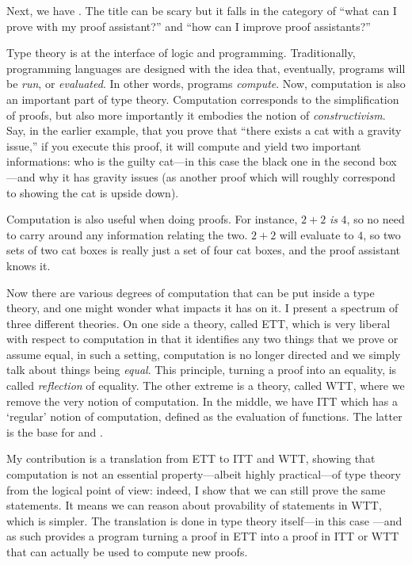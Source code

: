 Next, we have . The title can be scary but it falls in
the category of ``what can I prove with my proof assistant?'' and
``how can I improve proof assistants?''

Type theory is at the interface of logic and programming. Traditionally,
programming languages are designed with the idea that, eventually, programs
will be \emph{run}, or \emph{evaluated}. In other words, programs
\emph{compute}.
Now, computation is also an important part of type theory. Computation
corresponds to the simplification of proofs, but also more importantly it
embodies the notion of \emph{constructivism}. Say, in the earlier example,
that you prove that ``there exists a cat with a gravity issue,'' if you execute
this proof, it will compute and yield two important informations: who is the
guilty cat---in this case the black one in the second box---and why it has
gravity issues (as another proof which will roughly correspond to showing the
cat is upside down).

Computation is also useful when doing proofs. For instance, \(2 + 2\) \emph{is}
\(4\), so no need to carry around any information relating the two. \(2 + 2\)
will evaluate to \(4\), so two sets of two cat boxes is really just a set of
four cat boxes, and the proof assistant knows it.

Now there are various degrees of computation that can be put inside a type
theory, and one might wonder what impacts it has on it. I present a spectrum
of three different theories. On one side a theory, called \acrfull{ETT},
which is very liberal with respect to computation in that it identifies any two
things that we prove or assume equal, in such a setting, computation is no
longer directed and we simply talk about things being \emph{equal}.
This principle, turning a proof into an equality, is called \emph{reflection} of
equality.
The other extreme is a theory, called \acrfull{WTT}, where we remove the very
notion of computation. In the middle, we have \acrfull{ITT} which has a
`regular' notion of computation, defined as the evaluation of functions. The
latter is the base for \Coq and \Agda.

My contribution is a translation from \acrshort{ETT} to \acrshort{ITT} and
\acrshort{WTT}, showing that computation is not an essential property---albeit
highly practical---of type theory from the logical point of view: indeed, I show
that we can still prove the same statements.
It means we can reason about provability of statements in \acrshort{WTT}, which
is simpler.
The translation is done in type theory itself---in this case \Coq---and as such
provides a program turning a proof in \acrshort{ETT} into a proof in
\acrshort{ITT} or \acrshort{WTT} that can actually be used to compute new
proofs.


